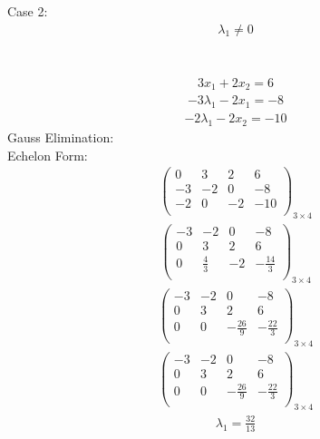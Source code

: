 \documentclass{article}
\begin{document}
Case 2: \begin{align*}
\lambda_{1}\ne0\end{align*}
 \\
\\
\begin{align*}
3x_{1} + 2x_{2}=6\end{align*}
\begin{align*}
-3\lambda_{1} - 2x_{1}=-8\end{align*}
\begin{align*}
-2\lambda_{1} - 2x_{2}=-10\end{align*}
Gauss Elimination:\\
Echelon Form:\\
\begin{align*}
\left(
\begin{array}{ccc|c}
0 & 3 & 2 & 6\\
-3 & -2 & 0 & -8\\
-2 & 0 & -2 & -10\\
\end{array}
\right)_{3\times 4}
\end{align*}
\begin{align*}
\left(
\begin{array}{ccc|c}
-3 & -2 & 0 & -8\\
0 & 3 & 2 & 6\\
0 & \frac{4}{3} & -2 & -\frac{14}{3}\\
\end{array}
\right)_{3\times 4}
\end{align*}
\begin{align*}
\left(
\begin{array}{ccc|c}
-3 & -2 & 0 & -8\\
0 & 3 & 2 & 6\\
0 & 0 & -\frac{26}{9} & -\frac{22}{3}\\
\end{array}
\right)_{3\times 4}
\end{align*}
\begin{align*}
\left(
\begin{array}{ccc|c}
-3 & -2 & 0 & -8\\
0 & 3 & 2 & 6\\
0 & 0 & -\frac{26}{9} & -\frac{22}{3}\\
\end{array}
\right)_{3\times 4}
\end{align*}
\begin{align*}
\lambda_{1}=\frac{32}{13}\end{align*}
\end{document}

